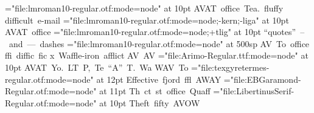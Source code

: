\font\lm="file:lmroman10-regular.otf:mode=node" at 10pt
\hbox{\lm AVAT office Tea. fluffy}
\hbox{\lm dif\-fi\-cult e-mail}
\font\lmnk="file:lmroman10-regular.otf:mode=node;-kern;-liga" at 10pt
\hbox{\lmnk AVAT office}
\font\lmtl="file:lmroman10-regular.otf:mode=node;+tlig" at 10pt
\hbox{\lmtl ``quotes'' -- and --- dashes}
\font\lmtiny="file:lmroman10-regular.otf:mode=node" at 500sp
\hbox{\lmtiny AV To office}
\hbox{\lm f\-f\-i dif\-fi\-c fi\-c}
\hbox{\lm{}x Waffle-iron afflict}
\hbox{\lm A\hbox{}V A\vrule V}
\font\ar="file:Arimo-Regular.ttf:mode=node" at 10pt
\hbox{\ar AVAT Yo. LT P, Te ``A'' T. Wa}
\hbox{\ar W\-A\-V T\-o}
\font\tm="file:texgyretermes-regular.otf:mode=node" at 12pt
\hbox{\tm Effective fjord ffl AWAY}
\font\eb="file:EBGaramond-Regular.otf:mode=node" at 11pt
\hbox{\eb Th ct st office Quaff}
\font\lib="file:LibertinusSerif-Regular.otf:mode=node" at 10pt
\hbox{\lib Theft fifty AVOW}

